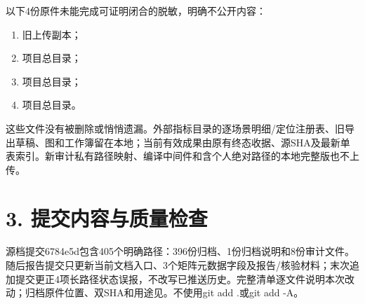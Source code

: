\documentclass[UTF8,a4paper,10pt,fontset=none]{ctexart}
\begin{document}
以下4份原件未能完成可证明闭合的脱敏，明确不公开内容：
\begin{enumerate}
\item 旧上传副本；
\item 项目总目录；
\item 项目总目录；
\item 项目总目录。
\end{enumerate}
这些文件没有被删除或悄悄遗漏。外部指标目录的逐场景明细/定位注册表、旧导出草稿、图和工作簿留在本地；当前有效成果由原有终态收据、源SHA及最新单表索引。新审计私有路径映射、编译中间件和含个人绝对路径的本地完整版也不上传。

\clearpage
\section*{3. 提交内容与质量检查}
源档提交6784e5d包含405个明确路径：396份归档、1份归档说明和8份审计文件。随后报告提交只更新当前文档入口、3个矩阵元数据字段及报告/核验材料；末次追加提交更正4项长路径状态误报，不改写已推送历史。完整清单逐文件说明本次改动；归档原件位置、双SHA和用途见。不使用git add .或git add -A。
\end{document}
